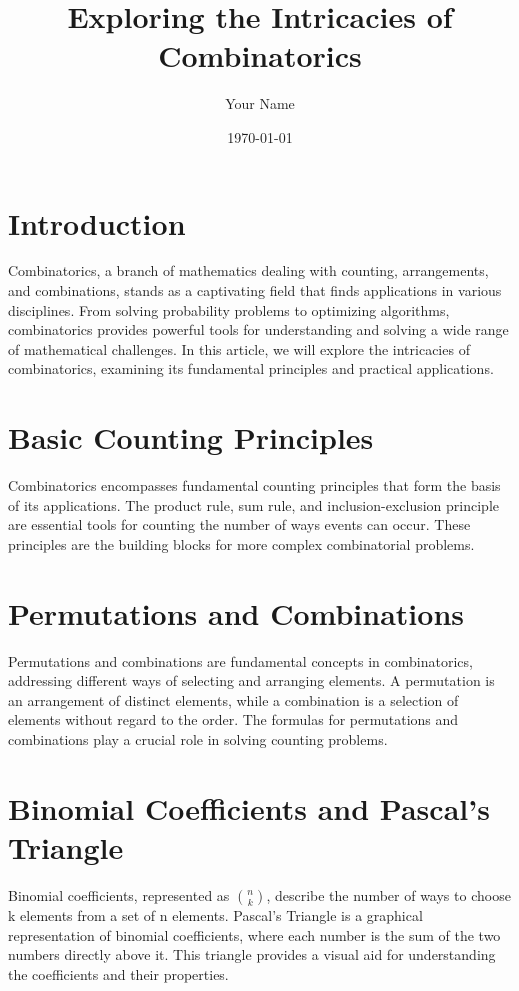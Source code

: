 \documentclass{article}
\title{Exploring the Intricacies of Combinatorics}
\author{Your Name}
\date{\today}
\begin{document}
\maketitle

\section*{Introduction}
Combinatorics, a branch of mathematics dealing with counting, arrangements, and combinations, stands as a captivating field that finds applications in various disciplines. From solving probability problems to optimizing algorithms, combinatorics provides powerful tools for understanding and solving a wide range of mathematical challenges. In this article, we will explore the intricacies of combinatorics, examining its fundamental principles and practical applications.

\section*{Basic Counting Principles}
Combinatorics encompasses fundamental counting principles that form the basis of its applications. The product rule, sum rule, and inclusion-exclusion principle are essential tools for counting the number of ways events can occur. These principles are the building blocks for more complex combinatorial problems.

\section*{Permutations and Combinations}
Permutations and combinations are fundamental concepts in combinatorics, addressing different ways of selecting and arranging elements. A permutation is an arrangement of distinct elements, while a combination is a selection of elements without regard to the order. The formulas for permutations and combinations play a crucial role in solving counting problems.

\section*{Binomial Coefficients and Pascal's Triangle}
Binomial coefficients, represented as ${n \choose k}$, describe the number of ways to choose k elements from a set of n elements. Pascal's Triangle is a graphical representation of binomial coefficients, where each number is the sum of the two numbers directly above it. This triangle provides a visual aid for understanding the coefficients and their properties.
\end{document}
